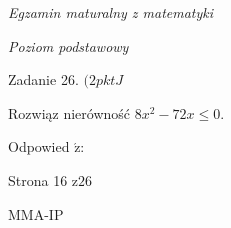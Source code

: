 \documentclass[a4paper,12pt]{article}
\begin{document}
{\it Egzamin maturalny z matematyki}

{\it Poziom podstawowy}

Zadanie 26. $(2pktJ$

Rozwiąz nierówność $8x^{2}-72x\leq 0.$

Odpowied $\acute{\mathrm{z}}$:

Strona 16 $\mathrm{z}26$

MMA-IP
\end{document}

